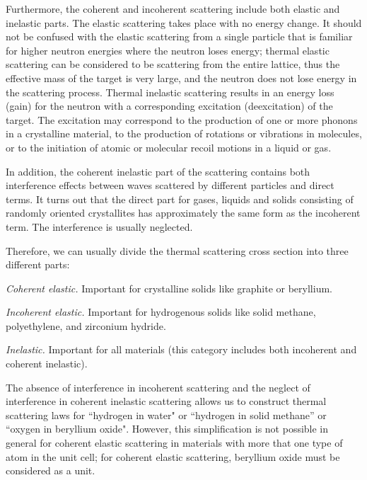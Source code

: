 Furthermore, the coherent and incoherent scattering include both
elastic and inelastic parts.  The elastic scattering takes place with
no energy change.  It should not be confused with the elastic
scattering from a single particle that is familiar for higher neutron
energies where the neutron loses energy; thermal elastic scattering can
be considered to be scattering from the entire lattice, thus the
effective mass of the target is very large, and the neutron does not
lose energy in the scattering process.  Thermal inelastic scattering
results in an energy loss (gain) for the neutron with a corresponding
excitation (deexcitation) of the target.  The excitation may correspond
to the production of one or more phonons in a crystalline material, to
the production of rotations or vibrations in molecules, or to the
initiation of atomic or molecular recoil motions in a liquid or gas.

In addition, the coherent inelastic part of the scattering contains both
interference effects between waves scattered by different particles and
direct terms.  It turns out that the direct part for gases, liquids and
solids consisting of randomly oriented crystallites has approximately the
same form as the incoherent term.  The interference is usually neglected.

Therefore, we can usually divide the thermal scattering cross section into
three different parts:

\begin{itemize}
\begin{singlespace}
   \item {\it Coherent elastic.}  Important for crystalline solids
        like graphite or beryllium.

   \item {\it Incoherent elastic.} Important for hydrogenous solids
        like solid methane, polyethylene, and zirconium
        hydride.

   \item {\it Inelastic.} Important for all materials
        (this category includes both incoherent and coherent
        inelastic).
\end{singlespace}
\end{itemize}

The absence of interference in incoherent scattering and the neglect of
interference in coherent inelastic scattering allows us to construct
thermal scattering laws for ``hydrogen in water" or ``hydrogen in
solid methane'' or ``oxygen in beryllium oxide".  However, this
simplification is not possible in general for coherent elastic scattering
in materials with more that one type of atom in the unit cell;
for coherent elastic scattering, beryllium oxide must be considered as
a unit.

